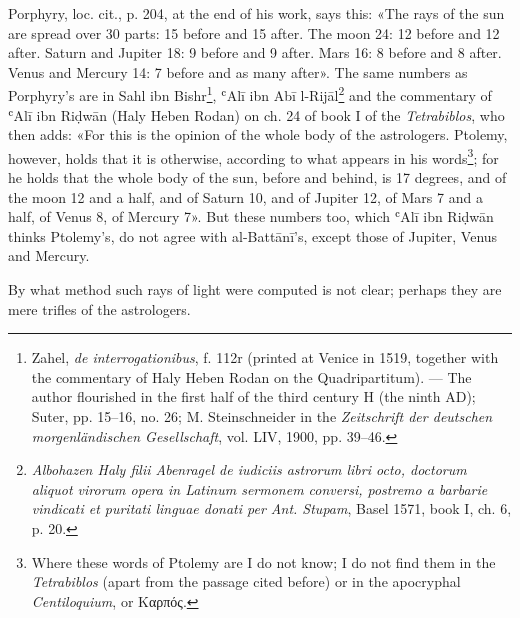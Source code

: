 \documentclass[11pt]{article}
\newcommand{\Pg}[1]{\marginpar{\footnotesize\color{gray}#1}}
\begin{document}
\par \Pg{I 306}Porphyry, loc. cit., p. 204, at the end of his work, says this: «The rays of the sun are spread over 30 parts: 15 before and 15 after. The moon 24: 12 before and 12 after. Saturn and Jupiter 18: 9 before and 9 after. Mars 16: 8 before and 8 after. Venus and Mercury 14: 7 before and as many after». The same numbers as Porphyry's are in Sahl ibn Bishr\footnote{Zahel, \emph{de interrogationibus}, f. 112r (printed at Venice in 1519, together with the commentary of Haly Heben Rodan on the Quadripartitum). — The author flourished in the first half of the third century H (the ninth AD); Suter, pp. 15–16, no. 26; M. Steinschneider in the \emph{Zeitschrift der deutschen morgenländischen Gesellschaft}, vol. LIV, 1900, pp. 39–46.}, ʿAlī ibn Abī l-Rijāl\footnote{\emph{Albohazen Haly filii Abenragel de iudiciis astrorum libri octo, doctorum aliquot virorum opera in Latinum sermonem conversi, postremo a barbarie vindicati et puritati linguae donati per Ant. Stupam}, Basel 1571, book I, ch. 6, p. 20.} and the commentary of ʿAlī ibn Riḍwān (Haly Heben Rodan) on ch. 24 of book I of the \emph{Tetrabiblos}, who then adds: «For this is the opinion of the whole body of the astrologers. Ptolemy, however, holds that it is otherwise, according to what appears in his words\footnote{Where these words of Ptolemy are I do not know; I do not find them in the \emph{Tetrabiblos} (apart from the passage cited before) or in the apocryphal \emph{Centiloquium}, or {\greekfont Καρπός}.}; for he holds that the whole body of the sun, before and behind, is 17 degrees, and of the moon 12 and a half, and of Saturn 10, and of Jupiter 12, of Mars 7 and a half, of Venus 8, of Mercury 7». But these numbers too, which ʿAlī ibn Riḍwān thinks Ptolemy's, do not agree with al-Battānī's, except those of Jupiter, Venus and Mercury.\par
\par By what method such rays of light were computed is not clear; perhaps they are mere trifles of the astrologers.\par
\end{document}
